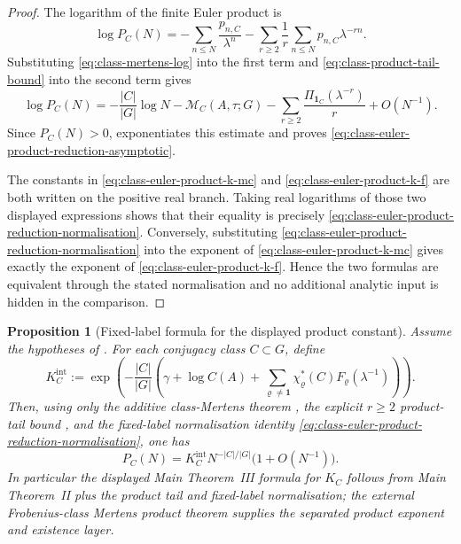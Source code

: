\documentclass[11pt,a4paper]{amsart}
\theoremstyle{plain}
\newtheorem{proposition}[theorem]{Proposition}
\theoremstyle{definition}
\theoremstyle{remark}
\begin{document}
\begin{proof}
  The logarithm of the finite Euler product is
  \[
    \log P_C(N)
    =
    -\sum_{n\le N}\frac{p_{n,C}}{\lambda^n}
    -
    \sum_{r\ge2}\frac1r\sum_{n\le N}p_{n,C}\lambda^{-rn}.
  \]
  Substituting \eqref{eq:class-mertens-log} into the first term and
  \eqref{eq:class-product-tail-bound} into the second term gives
  \[
    \log P_C(N)
    =
    -\frac{|C|}{|G|}\log N
    -\mathcal M_C(A,\tau;G)
    -\sum_{r\ge2}\frac{\Pi_{\mathbf1_C}(\lambda^{-r})}{r}
    +O(N^{-1}).
  \]
  Since \(P_C(N)>0\), 
  exponentiates this estimate and proves
  \eqref{eq:class-euler-product-reduction-asymptotic}.

  The constants in \eqref{eq:class-euler-product-k-mc} and
  \eqref{eq:class-euler-product-k-f} are both written on the positive real
  branch.  Taking real logarithms of those two displayed expressions shows
  that their equality is precisely
  \eqref{eq:class-euler-product-reduction-normalisation}.  Conversely,
  substituting \eqref{eq:class-euler-product-reduction-normalisation} into
  the exponent of \eqref{eq:class-euler-product-k-mc} gives exactly the
  exponent of \eqref{eq:class-euler-product-k-f}.  Hence the two formulas are
  equivalent through the stated normalisation and no additional analytic input
  is hidden in the comparison.
\end{proof}

\begin{proposition}[Fixed-label formula for the displayed product constant]
  \label{prop:class-product-internal-k-certificate}
  Assume the hypotheses of .  For each
  conjugacy class \(C\subset G\), define
  \begin{equation}\label{eq:class-product-internal-k-certificate}
    K_C^{\mathrm{int}}:=
    \exp\!\left(
      -\frac{|C|}{|G|}
      \left(
        \gamma+
        \log C(A)+
        \sum_{\varrho\ne\mathbf1}
          \chi_\varrho^\ast(C)F_\varrho(\lambda^{-1})
      \right)
    \right).
  \end{equation}
  Then, using only the additive class-Mertens theorem
  , the explicit
  \(r\ge2\) product-tail bound , and
  the fixed-label normalisation identity
  \eqref{eq:class-euler-product-reduction-normalisation}, one has
  \[
    P_C(N)=K_C^{\mathrm{int}}N^{-|C|/|G|}\bigl(1+O(N^{-1})\bigr).
  \]
  In particular the displayed Main Theorem~III formula for \(K_C\) follows
  from Main Theorem~II plus the product tail and fixed-label normalisation; the
  external Frobenius-class Mertens product theorem supplies the separated
  product exponent and existence layer.
\end{proposition}
\end{document}
